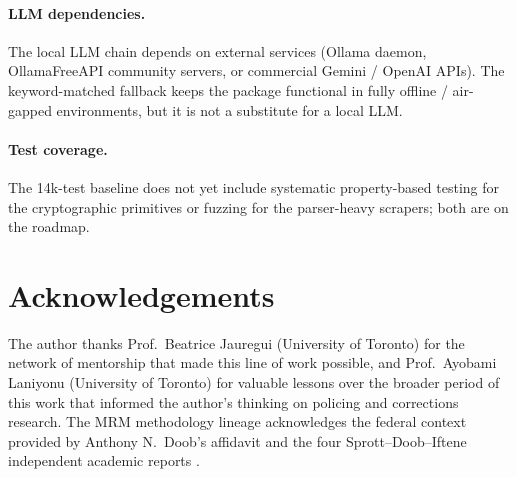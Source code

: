 \documentclass[11pt,a4paper]{article}
\theoremstyle{plain}
\theoremstyle{definition}
\theoremstyle{remark}
\begin{document}
\paragraph{LLM dependencies.} The local LLM chain depends on
external services (Ollama daemon, OllamaFreeAPI community servers,
or commercial Gemini / OpenAI APIs). The keyword-matched fallback
keeps the package functional in fully offline / air-gapped
environments, but it is not a substitute for a local LLM.

\paragraph{Test coverage.} The 14k-test baseline does not yet
include systematic property-based testing for the cryptographic
primitives or fuzzing for the parser-heavy scrapers; both are on
the roadmap.

\section*{Acknowledgements}

The author thanks Prof.\ Beatrice Jauregui (University of
Toronto) for the network of mentorship that made this line of
work possible, and Prof.\ Ayobami Laniyonu (University of
Toronto) for valuable lessons over the broader period of this
work that informed the author's thinking on policing and
corrections research. The MRM methodology lineage acknowledges
the federal context provided by Anthony N.\ Doob's affidavit and
the four Sprott--Doob--Iftene independent academic reports
\cite{SprottDoob2021Torture}.
\end{document}
